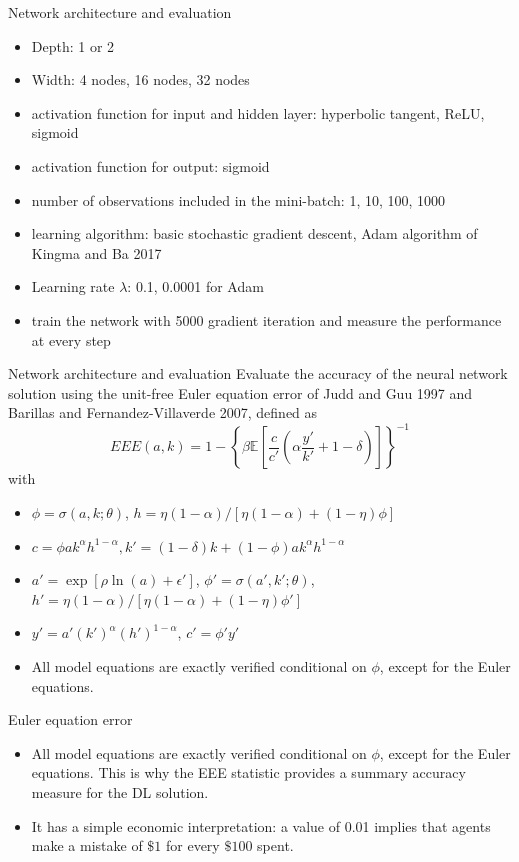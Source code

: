 \documentclass[aspectratio=169]{beamer} %
\begin{document}
\begin{frame}{Network architecture and evaluation}
\begin{itemize}
    \item Depth: 1 or 2
    \item Width: 4 nodes, 16 nodes, 32 nodes
    \item activation function for input and hidden layer: hyperbolic tangent, ReLU, sigmoid
    \item activation function for output: sigmoid
    \item number of observations included in the mini-batch: 1, 10, 100, 1000
    \item learning algorithm: basic stochastic gradient descent, Adam algorithm of Kingma and Ba 2017
    \item Learning rate $\lambda$: 0.1, 0.0001 for Adam
    \item train the network with 5000 gradient iteration and measure the performance at every step
\end{itemize}
    
\end{frame}

\begin{frame}{Network architecture and evaluation}
Evaluate the accuracy of the neural network solution using the unit-free Euler equation error of Judd and Guu 1997 and Barillas and Fernandez-Villaverde 2007, defined as
$$
EEE(a,k) = 1- \left\{\beta \mathbb{E} \left[\frac{c}{c'}\left(\alpha \frac{y'}{k'}+1-\delta\right)\right]\right\}^{-1}
$$
with
\begin{itemize}
    \item $\phi = \sigma(a,k;\theta)$, $h = \eta(1-\alpha)/[\eta(1-\alpha)+(1-\eta)\phi]$
    \item $c= \phi a k^\alpha h^{1-\alpha}, k' = (1-\delta)k+(1-\phi)ak^\alpha h^{1-\alpha}$
    \item $a' = \exp[\rho \ln(a)+\epsilon']$, $\phi' = \sigma(a',k';\theta)$, $h' = \eta(1-\alpha)/[\eta(1-\alpha)+(1-\eta)\phi'] $
    \item $y'=a'(k')^\alpha (h')^{1-\alpha}$, $c'=\phi' y'$
    \item All model equations are exactly verified conditional on $\phi$, except for the Euler equations.
\end{itemize}
    
\end{frame}

\begin{frame}{Euler equation error}
\begin{itemize}
    \item All model equations are exactly verified conditional on $\phi$, except for the Euler equations. This is why the EEE statistic provides a summary accuracy measure for the DL solution.
    \item It has a simple economic interpretation: a value of 0.01 implies that agents make a mistake of $\$1$ for every $\$100$ spent. 
\end{itemize}
    
\end{frame}
\end{document}
